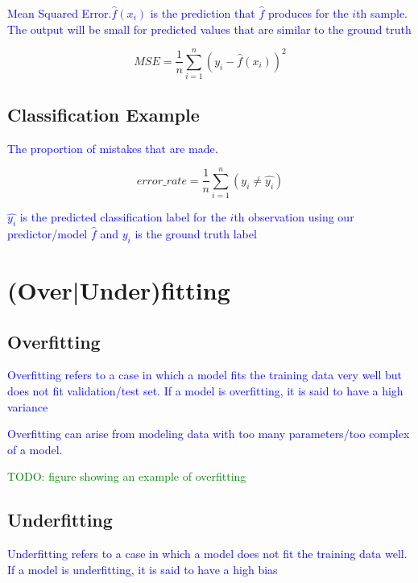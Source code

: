 \textcolor{blue}{Mean Squared Error.$\hat{f}(x_i)$ is the prediction that $\hat{f}$ produces for the $i$th sample. The output will be small for predicted values that are similar to the ground truth}

\begin{equation}
{MSE = \frac{1}{n}\sum_{i=1}^{n}(y_i - \hat{f}(x_i))^2}
\label{eq:MSE_def}
\end{equation}


\subsection{Classification Example}

\textcolor{blue}{The proportion of mistakes that are made.}

\begin{equation}
{error\_rate = \frac{1}{n}\sum_{i=1}^{n}(y_i \ne \hat{y_i})}
\label{eq:class_error_rate_def}
\end{equation}

\textcolor{blue}{$\hat{y_i}$ is the predicted classification label for the $i$th observation using our predictor/model $\hat{f}$ and $y_i$ is the ground truth label}

\section{(Over|Under)fitting}

\subsection{Overfitting}

\textcolor{blue}{Overfitting refers to a case in which a model fits the training data very well but does not fit validation/test set. If a model is overfitting, it is said to have a high variance}

\textcolor{blue}{Overfitting can arise from modeling data with too many parameters/too complex of a model.}

\textcolor{green}{TODO: figure showing an example of overfitting}

\subsection{Underfitting}

\textcolor{blue}{Underfitting refers to a case in which a model does not fit the training data well. If a model is underfitting, it is said to have a high bias}

